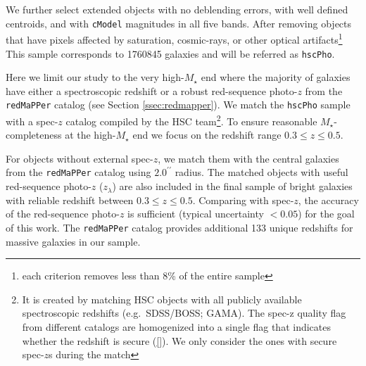 \documentclass{emulateapj}
\def\arcsec{{\prime\prime}}
\def\redm{\texttt{redMaPPer}}
\def\mstar{{$M_{\star}$}}
\begin{document}
\begin{CJK*}{UTF8}{gbsn}
    We further select extended objects with no deblending errors, with well defined 
    centroids, and with \texttt{cModel} magnitudes in all five bands. 
    After removing objects that have pixels affected by saturation, cosmic-rays, or 
    other optical artifacts\footnote{each criterion removes less than 8\% of the 
    entire sample}
    This sample corresponds to 1760845 galaxies and will be referred as \texttt{hscPho}. 
        
    Here we limit our study to the very high-\mstar{} end where the majority of galaxies 
    have either a spectroscopic redshift or a robust red-sequence photo-$z$ from the 
    \redm{} catalog (see Section \ref{ssec:redmapper}).  
    We match the \texttt{hscPho} sample with a spec-$z$ catalog compiled by the HSC 
    team\footnote{It is created by matching HSC objects with all publicly available 
    spectroscopic redshifts (e.g.\ SDSS/BOSS; GAMA). The spec-z quality flag from 
    different catalogs are homogenized into a single flag that indicates whether the 
    redshift is secure (\ref{}). 
    We only consider the ones with secure spec-$z$s during the match}.  
    To ensure reasonable \mstar{}-completeness at the high-\mstar{} end we focus on
    the redshift range $0.3 \leq z \leq 0.5$. 
   
    For objects without external spec-$z$, we match them with the central galaxies 
    from the \redm{} catalog using $2.0^{\arcsec}$ radius. 
    The matched objects with useful red-sequence photo-$z$ ($z_{\lambda}$) are also 
    included in the final sample of bright galaxies with reliable redshift between 
    $0.3 \leq z \leq 0.5$. 
    Comparing with spec-$z$, the accuracy of the red-sequence photo-$z$ is sufficient 
    (typical uncertainty $< 0.05$) for the goal of this work.
    The \redm{} catalog provides additional 133 unique redshifts for massive galaxies 
    in our sample.
        

\end{CJK*}
\end{document}
